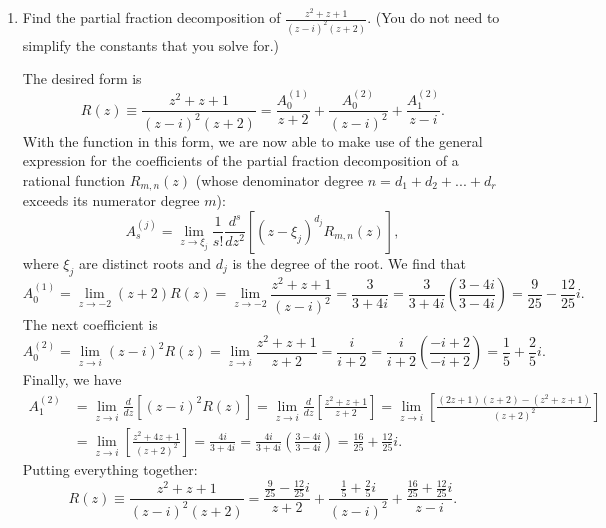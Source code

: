 \documentclass[11pt]{article}
\begin{document}
\begin{enumerate}
\begin{enumerate}
  \item Find the partial fraction decomposition of ${\displaystyle \frac{z^2 + z + 1}{(z - i)^2 (z + 2)}}$. (You do not need to simplify the constants that you solve for.)

  \begin{mdframed}
    The desired form is
    \begin{equation*}
      R(z) \equiv \frac{z^2 + z + 1}{(z - i)^2 (z + 2)} = \frac{A_0^{(1)}}{z+2} + \frac{A_0^{(2)}}{(z - i)^2} + \frac{A_1^{(2)}}{z - i}.
    \end{equation*}
    With the function in this form, we are now able to make use of the general expression for the coefficients of the partial fraction decomposition of a rational function $R_{m,n}(z)$ (whose denominator degree $n = d_1 + d_2 + ... + d_r$ exceeds its numerator degree $m$):
    \begin{equation*}
      A_s^{(j)} = \lim_{z\rightarrow\xi_j}\frac{1}{s!}\frac{d^s}{dz^2}\left[(z - \xi_j)^{d_j}R_{m,n}(z)\right],
    \end{equation*}
    where $\xi_j$ are distinct roots and $d_j$ is the degree of the root. We find that
    \begin{equation*}
      A_0^{(1)} = \lim_{z\rightarrow -2}(z + 2)R(z) = \lim_{z\rightarrow -2} \frac{z^2 + z + 1}{(z - i)^2} = \frac{3}{3 + 4i} = \frac{3}{3 + 4i}\left(\frac{3 - 4i}{3 - 4i}\right) = \frac{9}{25} - \frac{12}{25}i.
    \end{equation*}
    The next coefficient is
    \begin{equation*}
      A_0^{(2)} = \lim_{z\rightarrow i} (z - i)^2 R(z) = \lim_{z\rightarrow i} \frac{z^2 + z + 1}{z + 2} = \frac{i}{i + 2} = \frac{i}{i + 2}\left(\frac{-i + 2}{-i + 2}\right) = \frac{1}{5} + \frac{2}{5}i.
    \end{equation*}
    Finally, we have
    \begin{align*}
      A_1^{(2)} &= \lim_{z\rightarrow i} \frac{d}{dz}\left[(z - i)^2 R(z)\right] = \lim_{z\rightarrow i} \frac{d}{dz}\left[\frac{z^2 + z + 1}{z + 2}\right] = \lim_{z\rightarrow i} \left[\frac{(2z + 1)(z + 2) - (z^2 + z + 1)}{(z + 2)^2}\right] \\
      &= \lim_{z\rightarrow i} \left[\frac{z^2 + 4z + 1}{(z + 2)^2}\right] = \frac{4i}{3 + 4i} = \frac{4i}{3 + 4i}\left(\frac{3 - 4i}{3 - 4i}\right) = \frac{16}{25} + \frac{12}{25}i.
    \end{align*}
    Putting everything together:
    \begin{equation*}
      R(z) \equiv \frac{z^2 + z + 1}{(z - i)^2 (z + 2)} = \frac{\frac{9}{25} - \frac{12}{25}i}{z+2} + \frac{\frac{1}{5} + \frac{2}{5}i}{(z - i)^2} + \frac{\frac{16}{25} + \frac{12}{25}i}{z - i}.
    \end{equation*}
  \end{mdframed}
  

\end{enumerate}
\end{enumerate}
\end{document}

